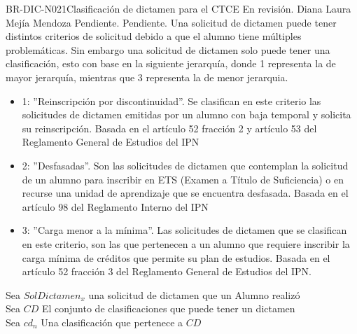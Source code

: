 \begin{BusinessRule}{BR-DIC-N021}{Clasificación de dictamen para el CTCE}
	{\bcDerivation}  %
	{\btEnabler}    %
	{\blControlling}    %
	\BRItem[Estado] En revisión.
	 Diana Laura Mejía Mendoza
	 Pendiente.
	 Pendiente.
	\BRItem[Descripción] Una solicitud de dictamen puede tener distintos criterios de solicitud debido a que el alumno tiene múltiples problemáticas. Sin embargo una solicitud de dictamen solo puede tener una clasificación, esto con base en la siguiente jerarquía, donde 1 representa la de mayor jerarquía, mientras que 3 representa la de menor jerarquia.
	\begin{itemize}
		
				
		\item 1: ''Reinscripción por discontinuidad''. Se clasifican en este criterio las solicitudes de dictamen emitidas por un alumno con baja temporal y solicita su reinscripción. Basada en el artículo 52 fracción 2 y artículo 53 del Reglamento General de Estudios del IPN
		
		\item 2: ''Desfasadas''. Son las solicitudes de dictamen que contemplan la solicitud de un alumno para inscribir en ETS (Examen a Título de Suficiencia) o en recurse una unidad de aprendizaje que se encuentra desfasada. Basada en el artículo 98 del Reglamento Interno del IPN
		
		\item 3: ''Carga menor a la mínima''. Las solicitudes de dictamen que se clasifican en este criterio, son las que pertenecen a un alumno que requiere inscribir la carga mínima de créditos que permite su plan de estudios. Basada en el artículo 52 fracción 3 del Reglamento General de Estudios del IPN.
		
	\end{itemize}
		\BRItem[Sentencia]
		Sea $SolDictamen_{x}$ una solicitud de dictamen que un Alumno realizó \\
		Sea $CD$ El conjunto de clasificaciones que puede tener un dictamen \\
		Sea $cd_{n}$ Una clasificación que pertenece a $CD$\\
		

\end{BusinessRule}
